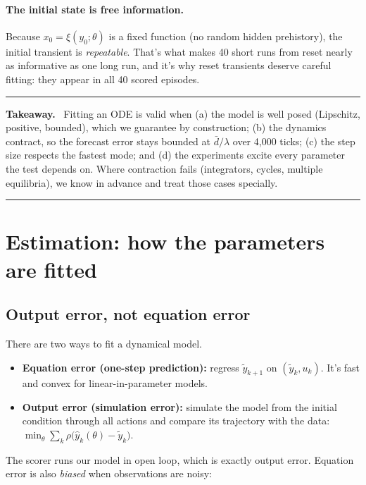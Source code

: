 \documentclass[11pt]{article}
\theoremstyle{plain}
\theoremstyle{definition}
\theoremstyle{remark}
\newenvironment{takeaway}{\par\medskip\noindent\begin{minipage}{\linewidth}\hrule\smallskip\noindent\textbf{Takeaway.}~}{\par\smallskip\hrule\end{minipage}\par\medskip}
\begin{document}
\paragraph{The initial state is free information.} Because $x_0=\xi(y_0;\theta)$ is a fixed function (no random hidden prehistory), the initial transient is \emph{repeatable}. That's what makes 40 short runs from reset nearly as informative as one long run, and it's why reset transients deserve careful fitting: they appear in all 40 scored episodes.

\begin{takeaway}
Fitting an ODE is valid when (a) the model is well posed (Lipschitz, positive, bounded), which we guarantee by construction; (b) the dynamics contract, so the forecast error stays bounded at $\bar d/\lambda$ over 4,000 ticks; (c) the step size respects the fastest mode; and (d) the experiments excite every parameter the test depends on. Where contraction fails (integrators, cycles, multiple equilibria), we know in advance and treat those cases specially.
\end{takeaway}

\section{Estimation: how the parameters are fitted}\label{sec:estimation}

\subsection{Output error, not equation error}
There are two ways to fit a dynamical model.
\begin{itemize}
\item \textbf{Equation error (one-step prediction):} regress $\tilde y_{k+1}$ on $(\tilde y_k,u_k)$. It's fast and convex for linear-in-parameter models.
\item \textbf{Output error (simulation error):} simulate the model from the initial condition through all actions and compare its trajectory with the data: $\min_\theta\sum_k\rho\big(\hat y_k(\theta)-\tilde y_k\big)$.
\end{itemize}
The scorer runs our model in open loop, which is exactly output error. Equation error is also \emph{biased} when observations are noisy:
\end{document}
